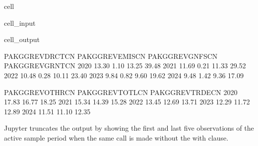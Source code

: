 \documentclass[letterpaper,10pt,english]{jupyterBook}
\begin{document}
\begin{sphinxuseclass}{cell}\begin{sphinxVerbatimInput}

\begin{sphinxuseclass}{cell_input}
\begin{sphinxVerbatim}[commandchars=\\\{\}]
 
    \PYG{p}{[}\PYG{p}{]}
\end{sphinxVerbatim}

\end{sphinxuseclass}\end{sphinxVerbatimInput}
\begin{sphinxVerbatimOutput}

\begin{sphinxuseclass}{cell_output}
\begin{sphinxVerbatim}[commandchars=\\\{\}]
      PAKGGREVDRCTCN  PAKGGREVEMISCN  PAKGGREVGNFSCN  PAKGGREVGRNTCN   
2020           13.30            1.10           13.25           39.48  \PYGZbs{}
2021           11.69            0.21           11.33           29.52   
2022           10.48            0.28           10.11           23.40   
2023            9.84            0.82            9.60           19.62   
2024            9.48            1.42            9.36           17.09   

      PAKGGREVOTHRCN  PAKGGREVTOTLCN  PAKGGREVTRDECN  
2020           17.83           16.77           18.25  
2021           15.34           14.39           15.28  
2022           13.45           12.69           13.71  
2023           12.29           11.72           12.89  
2024           11.51           11.10           12.35  
\end{sphinxVerbatim}

\end{sphinxuseclass}\end{sphinxVerbatimOutput}

\end{sphinxuseclass}
\sphinxAtStartPar
Jupyter truncates the output by showing the first and last five observations of the active sample period when the same call is  made without the with clause.
\end{document}

